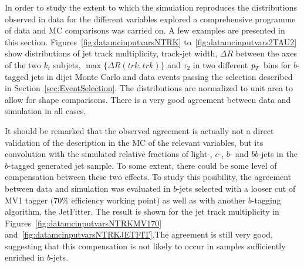  In order to study the extent to which the simulation reproduces the distributions observed in data for the different variables explored %
a comprehensive programme of data and MC comparisons was carried on. A few examples are presented in this section.
Figures~\ref{fig:datamcinputvarsNTRK} to~\ref{fig:datamcinputvars2TAU2} show distributions of jet track multiplicity, track-jet width, $\Delta R$ between the axes of the two $k_t$ subjets, $\max\{\Delta R(trk,trk)\}$ and $\tau_2$ in two different ${\emph{p}_{T}}$ bins for $b$-tagged jets in dijet Monte Carlo and data events passing the selection described in Section~\ref{sec:EventSelection}.
The distributions are normalized to unit area to allow for shape comparisons. There is a very good agreement between data and simulation in all cases.

It should be remarked that the observed agreement is actually not a direct validation of the description in the MC of the relevant variables, but its convolution with the simulated relative fractions of light-, $c$-, $b$- and $bb$-jets in the $b$-tagged generated jet sample. To some extent, there could be some level of compensation between these two effects. To study this posibility, the agreement between data and simulation was evaluated in $b$-jets selected with a looser cut of MV1 tagger (70\% efficiency working point) as well as with another $b$-tagging algorithm, the JetFitter. The result is shown for the jet track multiplicity in Figures~\ref{fig:datamcinputvarsNTRKMV170} and~\ref{fig:datamcinputvarsNTRKJETFIT}.The agreement is still very good, suggesting that this compensation is not likely to occur in samples sufficiently enriched in $b$-jets.



